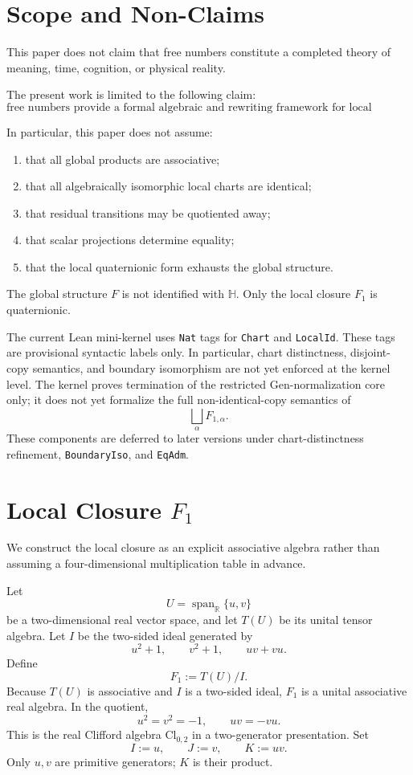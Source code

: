 \documentclass[11pt]{article}
\begin{document}
\section{Scope and Non-Claims}

This paper does not claim that free numbers constitute a completed theory of meaning, time, cognition, or physical reality.

The present work is limited to the following claim:
\[
\text{free numbers provide a formal algebraic and rewriting framework for local closures connected by admissible and residual chart structure.}
\]

In particular, this paper does not assume:
\begin{enumerate}
  \item that all global products are associative;
  \item that all algebraically isomorphic local charts are identical;
  \item that residual transitions may be quotiented away;
  \item that scalar projections determine equality;
  \item that the local quaternionic form exhausts the global structure.
\end{enumerate}

The global structure $F$ is not identified with $\mathbb H$. Only the local closure $F_1$ is quaternionic.

The current Lean mini-kernel uses \texttt{Nat} tags for \texttt{Chart} and \texttt{LocalId}. These tags are provisional syntactic labels only. In particular, chart distinctness, disjoint-copy semantics, and boundary isomorphism are not yet enforced at the kernel level. The kernel proves termination of the restricted Gen-normalization core only; it does not yet formalize the full non-identical-copy semantics of
\[
\bigsqcup_{\alpha} F_{1,\alpha}.
\]
These components are deferred to later versions under chart-distinctness refinement, \texttt{BoundaryIso}, and \texttt{EqAdm}.

\section{Local Closure \texorpdfstring{$F_1$}{F1}}

We construct the local closure as an explicit associative algebra rather than
assuming a four-dimensional multiplication table in advance.

Let
\[
U=\operatorname{span}_{\mathbb R}\{u,v\}
\]
be a two-dimensional real vector space, and let $T(U)$ be its unital tensor
algebra. Let $I$ be the two-sided ideal generated by
\[
u^2+1,\qquad v^2+1,\qquad uv+vu.
\]
Define
\[
\boxed{F_1:=T(U)/I.}
\]
Because $T(U)$ is associative and $I$ is a two-sided ideal, $F_1$ is a unital
associative real algebra. In the quotient,
\[
u^2=v^2=-1,\qquad uv=-vu.
\]
This is the real Clifford algebra $\mathrm{Cl}_{0,2}$ in a two-generator
presentation. Set
\[
I:=u,\qquad J:=v,\qquad K:=uv.
\]
Only $u,v$ are primitive generators; $K$ is their product.
\end{document}
